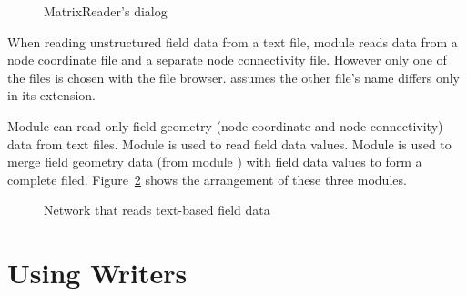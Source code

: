 \begin{figure}[htb]
  \centering
  \begin{makeimage} \end{makeimage}
  \MatrixReaderGUI
  \caption{\label{fig:MatrixReaderGUI} MatrixReader's dialog}
\end{figure}


When reading unstructured field data from a text file, module
 reads data from a node coordinate file and a
separate node connectivity file.  However only one of the files is
chosen with the file browser.   assumes the other
file's name differs only in its extension.

Module  can read only field geometry (node
coordinate and node connectivity) data from text files.  Module
 is used to read field data values.  Module
 is used to merge field geometry data (from
module ) with field data values to form a complete
filed.  Figure~\ref{fig:ReadFieldNet} shows the arrangement of these
three modules.

\begin{figure}[htb]
  \centering
  \begin{makeimage} \end{makeimage}
  \ReadFieldNet
  \caption{\label{fig:ReadFieldNet} Network that reads text-based field data}
\end{figure}

\section{Using Writers}
\label{sec:using_writers}

\newcommand{\FieldWriterGUI}{%
  \centerline{\texttt{[image: Figures/FieldWriterGUI.eps.gz]}}
}
\begin{htmlonly}
  \newcommand{\FieldWriterGUI}{%
    \htmladdimg[alt="FieldWriter dialog"]{../Figures/FieldWriterGUI.gif}
  }
\end{htmlonly}

\newcommand{\WriteFieldNet}{%
  \centerline{\texttt{[image: Figures/WriteFieldNet.eps.gz]}}
}
\begin{htmlonly}
  \newcommand{\WriteFieldNet}{%
    \htmladdimg[alt="Network that reads a text-based field"]{../Figures/WriteFieldNet.gif}
  }
\end{htmlonly}

